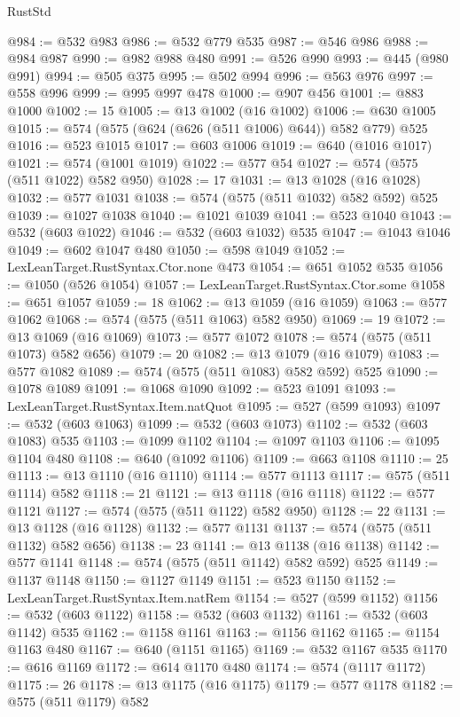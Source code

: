 \begin{lexlean}{RustStd}
\begin{coremodule}
@984 := @532 @983
@986 := @532 @779 @535
@987 := @546 @986
@988 := @984 @987
@990 := @982 @988 @480
@991 := @526 @990
@993 := @445 (@980 @991)
@994 := @505 @375
@995 := @502 @994
@996 := @563 @976
@997 := @558 @996
@999 := @995 @997 @478
@1000 := @907 @456
@1001 := @883 @1000
@1002 := 15
@1005 := @13 @1002 (@16 @1002)
@1006 := @630 @1005
@1015 := @574 (@575 (@624 (@626 (@511 @1006) @644)) @582 @779) @525
@1016 := @523 @1015
@1017 := @603 @1006
@1019 := @640 (@1016 @1017)
@1021 := @574 (@1001 @1019)
@1022 := @577 @54
@1027 := @574 (@575 (@511 @1022) @582 @950)
@1028 := 17
@1031 := @13 @1028 (@16 @1028)
@1032 := @577 @1031
@1038 := @574 (@575 (@511 @1032) @582 @592) @525
@1039 := @1027 @1038
@1040 := @1021 @1039
@1041 := @523 @1040
@1043 := @532 (@603 @1022)
@1046 := @532 (@603 @1032) @535
@1047 := @1043 @1046
@1049 := @602 @1047 @480
@1050 := @598 @1049
@1052 := LexLeanTarget.RustSyntax.Ctor.none @473
@1054 := @651 @1052 @535
@1056 := @1050 (@526 @1054)
@1057 := LexLeanTarget.RustSyntax.Ctor.some
@1058 := @651 @1057
@1059 := 18
@1062 := @13 @1059 (@16 @1059)
@1063 := @577 @1062
@1068 := @574 (@575 (@511 @1063) @582 @950)
@1069 := 19
@1072 := @13 @1069 (@16 @1069)
@1073 := @577 @1072
@1078 := @574 (@575 (@511 @1073) @582 @656)
@1079 := 20
@1082 := @13 @1079 (@16 @1079)
@1083 := @577 @1082
@1089 := @574 (@575 (@511 @1083) @582 @592) @525
@1090 := @1078 @1089
@1091 := @1068 @1090
@1092 := @523 @1091
@1093 := LexLeanTarget.RustSyntax.Item.natQuot
@1095 := @527 (@599 @1093)
@1097 := @532 (@603 @1063)
@1099 := @532 (@603 @1073)
@1102 := @532 (@603 @1083) @535
@1103 := @1099 @1102
@1104 := @1097 @1103
@1106 := @1095 @1104 @480
@1108 := @640 (@1092 @1106)
@1109 := @663 @1108
@1110 := 25
@1113 := @13 @1110 (@16 @1110)
@1114 := @577 @1113
@1117 := @575 (@511 @1114) @582
@1118 := 21
@1121 := @13 @1118 (@16 @1118)
@1122 := @577 @1121
@1127 := @574 (@575 (@511 @1122) @582 @950)
@1128 := 22
@1131 := @13 @1128 (@16 @1128)
@1132 := @577 @1131
@1137 := @574 (@575 (@511 @1132) @582 @656)
@1138 := 23
@1141 := @13 @1138 (@16 @1138)
@1142 := @577 @1141
@1148 := @574 (@575 (@511 @1142) @582 @592) @525
@1149 := @1137 @1148
@1150 := @1127 @1149
@1151 := @523 @1150
@1152 := LexLeanTarget.RustSyntax.Item.natRem
@1154 := @527 (@599 @1152)
@1156 := @532 (@603 @1122)
@1158 := @532 (@603 @1132)
@1161 := @532 (@603 @1142) @535
@1162 := @1158 @1161
@1163 := @1156 @1162
@1165 := @1154 @1163 @480
@1167 := @640 (@1151 @1165)
@1169 := @532 @1167 @535
@1170 := @616 @1169
@1172 := @614 @1170 @480
@1174 := @574 (@1117 @1172)
@1175 := 26
@1178 := @13 @1175 (@16 @1175)
@1179 := @577 @1178
@1182 := @575 (@511 @1179) @582

\end{coremodule}
\end{lexlean}

